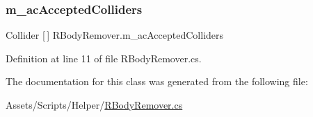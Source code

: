\subsubsection{\texorpdfstring{m\+\_\+ac\+Accepted\+Colliders}{m\_acAcceptedColliders}}
{\footnotesize\ttfamily Collider \mbox{[}$\,$\mbox{]} R\+Body\+Remover.\+m\+\_\+ac\+Accepted\+Colliders}



Definition at line 11 of file R\+Body\+Remover.\+cs.



The documentation for this class was generated from the following file\+:\begin{DoxyCompactItemize}
\item 
Assets/\+Scripts/\+Helper/\mbox{\hyperlink{_r_body_remover_8cs}{R\+Body\+Remover.\+cs}}\end{DoxyCompactItemize}
